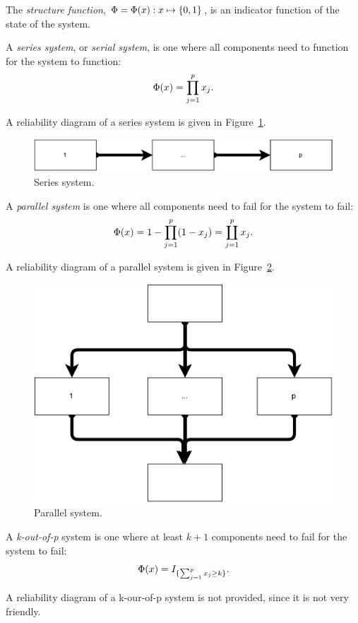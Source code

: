\begin{definition}
The \emph{structure function}, $\Phi=\Phi(x):x \mapsto \{ 0,1 \}$, is an indicator function of the state of the system.
\end{definition}

\begin{definition}
A \emph{series system}, or \emph{serial system}, is one where all components need to function for the system to function: $$\Phi(x)=\prod_{j=1}^{p}x_j.$$
\end{definition}
A reliability diagram of a series system is given in Figure~\ref{fig:series_system}.
\begin{figure}[ht]
\centering
\includegraphics[width=0.7\linewidth]{art/series_system}
\caption{Series system.}
\label{fig:series_system}
\end{figure}


\begin{definition}
A \emph{parallel system} is one where all components need to fail for the system to fail:
$$\Phi(x)=1-\prod_{j=1}^{p} (1-x_j)= \coprod_{j=1}^p x_j.$$
\end{definition}
A reliability diagram of a parallel system is given in Figure~\ref{fig:parallel_system}.
\begin{figure}[ht]
\centering
\includegraphics[width=0.7\linewidth]{art/parallel_system}
\caption{Parallel system.}
\label{fig:parallel_system}
\end{figure}


\begin{definition}
A \emph{k-out-of-p} system is one where at least $k+1$ components need to fail for the system to fail:
$$\Phi(x)=I_{\{ \sum_{j=1}^{p} x_j \geq k \}}.$$
\end{definition}
A reliability diagram of a k-our-of-p system is not provided, since it is not very friendly.





